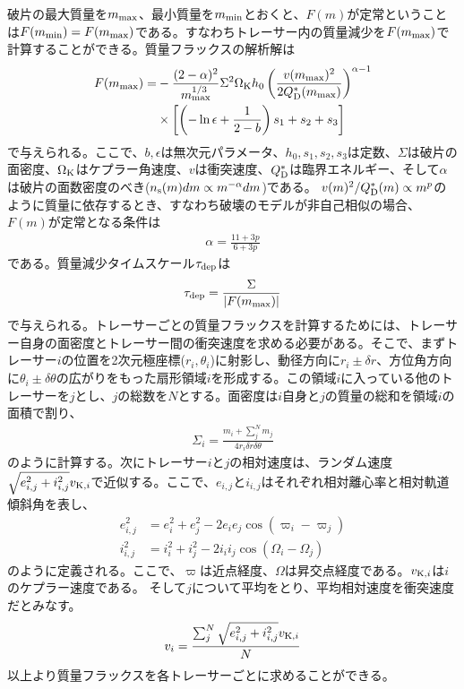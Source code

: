 \documentclass[a4paper,10pt,oneside,twocolumn,notitlepage,final]{jarticle}
\begin{document}
破片の最大質量を$m_{\rm max}$、最小質量を$m_{\rm min}$とおくと、$F(m)$が定常ということは$F(m_{\rm min}) = F(m_{\rm max})$である。すなわちトレーサー内の質量減少を$F(m_{\rm max})$で計算することができる。質量フラックスの解析解は
\begin{align}
 F(m_{\rm max}) =& - \frac{(2 - \alpha)^2}{m_{\rm max}^{1/3}} \Sigma^2 \Omega_{\rm K} h_0 \left( \frac{v(m_{\rm max})^2}{2 Q_{\rm D}^{\ast}(m_{\rm max})} \right)^{\alpha - 1} \nonumber \\
 &\times \left[ \left( - \ln \epsilon + \frac{1}{2 - b} \right) s_1 + s_2 + s_3 \right]
\end{align}
で与えられる。ここで、$b,\epsilon$は無次元パラメータ、$h_0,s_1,s_2,s_3$は定数、$\Sigma$は破片の面密度、$\Omega_{\rm K}$はケプラー角速度、$v$は衝突速度、$Q_{\rm D}^{\ast}$は臨界エネルギー、そして$\alpha$は破片の面数密度のべき($n_{\rm s} (m) dm \propto m^{- \alpha} dm$)である。
$v(m)^2/Q_{\rm D}^{\ast}(m) \propto m^p$のように質量に依存するとき、すなわち破壊のモデルが非自己相似の場合、$F(m)$が定常となる条件は
\begin{align}
 \alpha = \frac{11 + 3p}{6 + 3p}
\end{align}
である。質量減少タイムスケール$\tau_{\rm dep}$は
\begin{align}
 \tau_{\rm dep} = \frac{\Sigma}{|F(m_{\rm max})|}
\end{align}
で与えられる。トレーサーごとの質量フラックスを計算するためには、トレーサー自身の面密度とトレーサー間の衝突速度を求める必要がある。そこで、まずトレーサー$i$の位置を2次元極座標($r_i,\theta_i$)に射影し、動径方向に$r_i \pm \delta r$、方位角方向に$\theta_i \pm \delta \theta$の広がりをもった扇形領域$i$を形成する。この領域$i$に入っている他のトレーサーを$j$とし、$j$の総数を$N$とする。面密度は$i$自身と$j$の質量の総和を領域$i$の面積で割り、
\begin{align}
 \Sigma_i = \frac{m_i + \sum_{j}^{N} m_j}{4 r_i \delta r \delta \theta}
\end{align}
のように計算する。次にトレーサー$i$と$j$の相対速度は、ランダム速度$\sqrt{e_{i,j}^2 + i_{i,j}^2} v_{{\rm K},i}$で近似する。ここで、$e_{i,j}$と$i_{i,j}$はそれぞれ相対離心率と相対軌道傾斜角を表し、
\begin{align}
 e_{i,j}^2 &= e_i^2 + e_j^2 - 2 e_i e_j \cos(\varpi_i - \varpi_j)\\
 i_{i,j}^2 &= i_i^2 + i_j^2 - 2 i_i i_j \cos(\Omega_i - \Omega_j)
\end{align}
のように定義される。ここで、$\varpi$は近点経度、$\Omega$は昇交点経度である。$v_{{\rm K},i}$は$i$のケプラー速度である。
そして$j$について平均をとり、平均相対速度を衝突速度だとみなす。
\begin{align}
 v_i = \frac{\sum_{j}^{N} \sqrt{e_{i,j}^2+i_{i,j}^2} v_{{\rm K},i}}{N}
\end{align}
以上より質量フラックスを各トレーサーごとに求めることができる。
\end{document}
